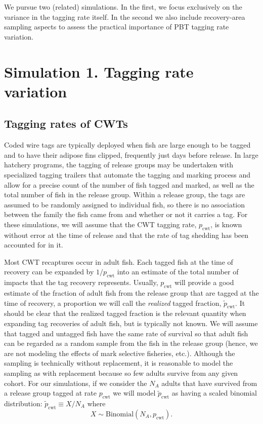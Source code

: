 \documentclass[11pt]{article}
\begin{document}
We pursue two (related) simulations.  In the first, we focus  exclusively on the
variance in the tagging rate itself.  In the second we also include recovery-area sampling
aspects to assess the practical importance of PBT tagging rate variation.

\section{Simulation 1. Tagging rate variation}

\subsection{Tagging rates of CWTs}
Coded wire tags are typically deployed
when fish are large enough to be tagged and to have their adipose fins clipped, frequently
just days before release.  In large hatchery programs, the tagging of release
groups may be undertaken with specialized tagging trailers that automate the tagging and marking
process and allow for a precise count of the number of fish tagged and marked,
as well as the total number of fish in the release group.  Within a release group, the tags are
assumed to be randomly assigned to individual fish, so there is no association between the family
the fish came from and whether or not it carries a tag.  For these simulations, we will assume
that the CWT tagging rate, $p_\mathrm{cwt}$, is known without error at the time of release and that
the rate of tag shedding has been accounted for in it. 

Most CWT recaptures occur in adult fish.  Each tagged fish at the time of recovery can be
expanded by $1/p_\mathrm{cwt}$ into an estimate of the total number of impacts that the tag recovery represents.
Usually, $p_\mathrm{cwt}$ will provide a good estimate of the fraction of adult fish from the release group
that are tagged at the time of recovery, a proportion we will call the {\em realized} tagged
fraction, $\tilde{p}_\mathrm{cwt}$.  It should be clear that the realized
tagged fraction is the relevant quantity when expanding
tag recoveries of adult fish, but is typically not known.  
We will assume that tagged and untagged fish have the same rate of
survival so that adult fish can be regarded as a random sample from the fish in the release group (hence,
we are not modeling the
effects of mark selective fisheries, etc.).
Although the sampling is technically without replacement, it is reasonable to model the sampling as
with replacement because so few adults survive from any given cohort.  For our simulations, if we consider the
$N_A$ adults that have survived from a release group tagged at rate $p_\mathrm{cwt}$  we will
model $\tilde{p}_\mathrm{cwt}$ as having a scaled binomial distribution:
$	\tilde{p}_\mathrm{cwt} \equiv X/N_A$ where 
\[
X \sim \mathrm{Binomial}(N_A, p_\mathrm{cwt}).
\]
\end{document}
